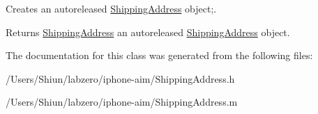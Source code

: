 Creates an autoreleased \hyperlink{interface_shipping_address}{ShippingAddress} object;. 

\begin{DoxyReturn}{Returns}
\hyperlink{interface_shipping_address}{ShippingAddress} an autoreleased \hyperlink{interface_shipping_address}{ShippingAddress} object. 
\end{DoxyReturn}


The documentation for this class was generated from the following files:\begin{DoxyCompactItemize}
\item 
/Users/Shiun/labzero/iphone-\/aim/ShippingAddress.h\item 
/Users/Shiun/labzero/iphone-\/aim/ShippingAddress.m\end{DoxyCompactItemize}
